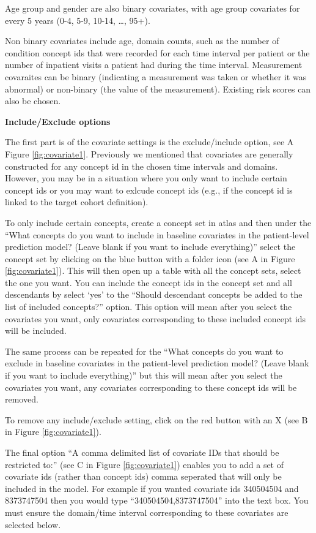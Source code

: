 \documentclass[11pt]{book}
\begin{document}
Age group and gender are also binary covariates, with age group
covariates for every 5 years (0-4, 5-9, 10-14, \ldots{}, 95+).

Non binary covariates include age, domain counts, such as the number of
condition concept ids that were recorded for each time interval per
patient or the number of inpatient visits a patient had during the time
interval. Measurement covaraites can be binary (indicating a measurement
was taken or whether it was abnormal) or non-binary (the value of the
measurement). Existing risk scores can also be chosen.

\textbf{Include/Exclude options}

The first part is of the covariate settings is the exclude/include
option, see A Figure \ref{fig:covariate1}. Previously we mentioned that
covariates are generally constructed for any concept id in the chosen
time intervals and domains. However, you may be in a situation where you
only want to include certain concept ids or you may want to exlcude
concept ids (e.g., if the concept id is linked to the target cohort
definition).

To only include certain concepts, create a concept set in atlas and then
under the ``What concepts do you want to include in baseline covariates
in the patient-level prediction model? (Leave blank if you want to
include everything)'' select the concept set by clicking on the blue
button with a folder icon (see A in Figure \ref{fig:covariate1}). This
will then open up a table with all the concept sets, select the one you
want. You can include the concept ids in the concept set and all
descendants by select `yes' to the ``Should descendant concepts be added
to the list of included concepts?'' option. This option will mean after
you select the covariates you want, only covariates corresponding to
these included concept ids will be included.

The same process can be repeated for the ``What concepts do you want to
exclude in baseline covariates in the patient-level prediction model?
(Leave blank if you want to include everything)'' but this will mean
after you select the covariates you want, any covariates corresponding
to these concept ids will be removed.

To remove any include/exclude setting, click on the red button with an X
(see B in Figure \ref{fig:covariate1}).

The final option ``A comma delimited list of covariate IDs that should
be restricted to:'' (see C in Figure \ref{fig:covariate1}) enables you
to add a set of covariate ids (rather than concept ids) comma seperated
that will only be included in the model. For example if you wanted
covariate ids 340504504 and 8373747504 then you would type
``340504504,8373747504'' into the text box. You must ensure the
domain/time interval corresponding to these covariates are selected
below.
\end{document}
